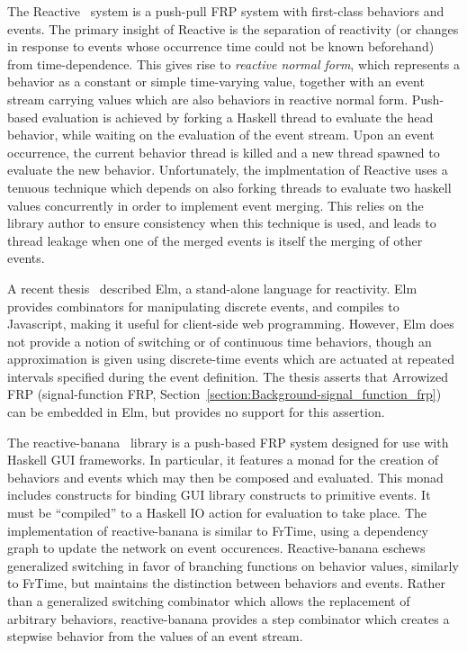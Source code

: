 The Reactive~\cite{Elliott2009} system is a push-pull FRP system with
first-class behaviors and events. The primary insight of Reactive is the
separation of reactivity (or changes in response to events whose occurrence time
could not be known beforehand) from time-dependence. This gives rise to {\em
reactive normal form}, which represents a behavior as a constant or simple
time-varying value, together with an event stream carrying values which are also
behaviors in reactive normal form. Push-based evaluation is achieved by forking
a Haskell thread to evaluate the head behavior, while waiting on the evaluation
of the event stream. Upon an event occurrence, the current behavior thread is
killed and a new thread spawned to evaluate the new behavior. Unfortunately, the
implmentation of Reactive uses a tenuous technique which depends on also forking
threads to evaluate two haskell values concurrently in order to implement event
merging. This relies on the library author to ensure consistency when this
technique is used, and leads to thread leakage when one of the merged events is
itself the merging of other events.

A recent thesis~\cite{Czaplicki2012} described Elm, a stand-alone language for
reactivity. Elm provides combinators for manipulating discrete events, and
compiles to Javascript, making it useful for client-side web programming.
However, Elm does not provide a notion of switching or of continuous time
behaviors, though an approximation is given using discrete-time events which are
actuated at repeated intervals specified during the event definition. The thesis
asserts that Arrowized FRP (signal-function FRP, Section~\ref{section:Background-signal_function_frp})
can be embedded in Elm, but provides no support for this assertion.

The reactive-banana~\cite{Apfelmus} library is a push-based FRP system designed
for use with Haskell GUI frameworks. In particular, it features a monad for
the creation of behaviors and events which may then be composed and evaluated.
This monad includes constructs for binding GUI library constructs to primitive
events. It must be ``compiled'' to a Haskell IO action for evaluation to take
place. The implementation of reactive-banana is similar to FrTime, using a
dependency graph to update the network on event occurences. Reactive-banana
eschews generalized switching in favor of branching functions on behavior
values, similarly to FrTime, but maintains the distinction between behaviors and
events. Rather than a generalized switching combinator which allows the
replacement of arbitrary behaviors, reactive-banana provides a step combinator
which creates a stepwise behavior from the values of an event stream.

